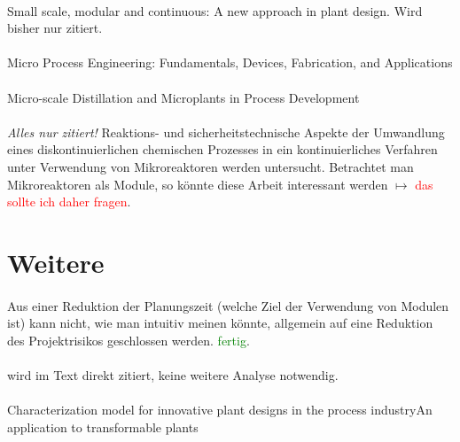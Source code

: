 \paragraph*{\cite{Seifert_2012}} Small scale, modular and continuous: A new approach in plant design. Wird bisher nur zitiert. 

\paragraph*{\cite{Kockmann_2014}} Micro Process Engineering: Fundamentals, Devices, Fabrication, and Applications

\paragraph*{\cite{Sundberg_2014}} Micro-scale Distillation and Microplants in Process Development

\paragraph*{\cite{Hugo_2009}}
\textit{Alles nur zitiert!} \hfill \newline
Reaktions- und sicherheitstechnische Aspekte der Umwandlung eines diskontinuierlichen
chemischen Prozesses in ein kontinuierliches Verfahren unter Verwendung von Mikroreaktoren werden untersucht. Betrachtet man Mikroreaktoren als Module, so k\"onnte diese Arbeit interessant werden $\mapsto$ \textcolor{red}{das sollte ich daher fragen}. 

\section{Weitere}

\paragraph*{\cite{Meier_2012}} Aus einer Reduktion der Planungszeit (welche Ziel der Verwendung von Modulen ist) kann nicht, wie man intuitiv meinen k\"onnte, allgemein auf eine Reduktion des Projektrisikos geschlossen werden. \textcolor{green}{fertig}.

\paragraph*{\cite{Yang_2017}} wird im Text direkt zitiert, keine weitere Analyse notwendig.

\paragraph*{\cite{Woersdoerfer_2016}} Characterization model for innovative plant designs in the process industry{\textemdash}An application to transformable plants

